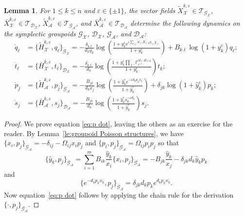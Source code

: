\documentclass{amsart}
\newtheorem{lemma}[theorem]{Lemma}
\numberwithin{equation}{section}
\newcommand{\cA}{\mathcal{A}}
\newcommand{\cG}{\mathcal{G}}
\newcommand{\cD}{\mathcal{D}}
\newcommand{\cX}{\mathcal{X}}
\newcommand{\cT}{\mathcal{T}}
\begin{document}
\begin{lemma}
  For $1\le k\le n$ and $\varepsilon\in\{\pm1\}$, the vector fields $\tilde X_\cX^{k,\varepsilon}\in\cT_{\cG_\cX}$, $\bar X_\cX^{k,\varepsilon}\in\cT_{\cD_\cX}$, $\tilde X_\cA^{k,\varepsilon}\in\cT_{\cG_\cA}$, and $\bar X_\cA^{k,\varepsilon}\in\cT_{\cD_\cA}$ determine the following dynamics on the symplectic groupoids $\cG_\cX$, $\cD_\cX$, $\cG_\cA$, and $\cD_\cA$:
  \begin{align}
    \dot q_\ell&=\{\tilde H_\cX^{k,\varepsilon},q_\ell\}_{\cG_\cX}=-\frac{\delta_{k\ell}}{d_ky_k}\log\left(\frac{1+y_k^\varepsilon e^{\varepsilon\sum_{\ell'} d_{\ell'} B_{\ell' k}q_{\ell'} y_{\ell'}}}{1+y_k^\varepsilon}\right)+B_{k\ell}\log(1+y_k^\varepsilon)q_\ell;\\
    \dot t_\ell&=\{\bar H_\cX^{k,\varepsilon},t_\ell\}_{\cD_\cX}=-\frac{\delta_{k\ell}}{d_k}\log\left(\frac{1+y_k^\varepsilon \prod_{\ell'}t_{\ell'}^{\varepsilon d_{\ell'} B_{\ell' k}}}{1+y_k^\varepsilon}\right)t_k;\\
    \label{eq:p dot}\dot p_j&=\{\tilde H_\cA^{k,\varepsilon},p_j\}_{\cG_\cA}=-\frac{B_{jk}}{d_kx_j}\log\left(\frac{1+\hat y_k^\varepsilon e^{-\varepsilon d_kp_kx_k}}{1+\hat y_k^\varepsilon}\right)+\delta_{jk}\log(1+\hat y_k^\varepsilon)p_k;\\
    \label{eq:s dot}\dot s_j&=\{\bar H_\cA^{k,\varepsilon},s_j\}_{\cD_\cA}=-\frac{B_{jk}}{d_k}\log\left(\frac{1+\hat y_k^\varepsilon s_k^{-\varepsilon d_k}}{1+\hat y_k^\varepsilon}\right)s_j.
  \end{align}
\end{lemma}
\begin{proof}
  We prove equation \eqref{eq:p dot}, leaving the others as an exercise for the reader.
  By Lemma~\ref{le:groupoid Poisson structures}, we have $\{x_i,p_j\}_{\cG_\cA}=-\delta_{ij}-\Omega_{ij}x_ip_j$ and $\{p_i,p_j\}_{\cG_\cA}=\Omega_{ij}p_ip_j$ so that
  \[\{\hat y_k,p_j\}_{\cG_\cA}=\sum_{i=1}^m B_{ik}\frac{\hat y_k}{x_i}\{x_i,p_j\}_{\cG_\cA}=-B_{jk}\frac{\hat y_k}{x_j}-\delta_{jk}d_k\hat y_kp_k\]
  and
  \[\{e^{-d_kp_kx_k},p_j\}_{\cG_\cA}=\delta_{jk}d_kp_ke^{d_kp_kx_k}.\]
  Now equation~\eqref{eq:p dot} follows by applying the chain rule for the derivation $\{\cdot,p_j\}_{\cG_\cA}$.
\end{proof}
\end{document}
